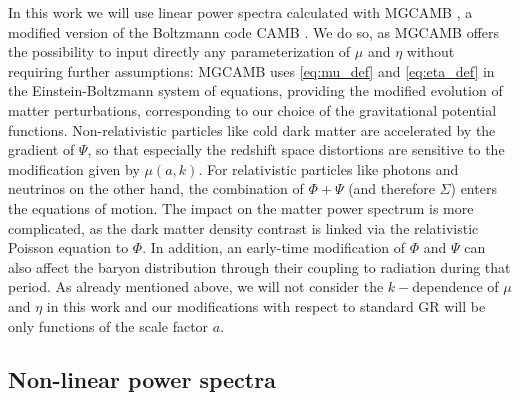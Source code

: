 In this work we will use linear power spectra calculated with MGCAMB
\cite{zhao_searching_2009,hojjati_testing_2011}, a modified version
of the Boltzmann code CAMB \cite{lewis_efficient_2000}. We do so,
as MGCAMB offers the possibility to input directly any parameterization
of $\mu$ and $\eta$ without requiring further assumptions:
MGCAMB uses \cref{eq:mu_def} and \cref{eq:eta_def} in the Einstein-Boltzmann
system of equations, providing the modified evolution of matter perturbations,
corresponding to our choice of the gravitational potential functions.
Non-relativistic particles like cold dark matter are accelerated by the
gradient of $\Psi$, so that especially the redshift space distortions are
sensitive to the modification given by $\mu(a,k)$. For relativistic particles
like photons and neutrinos on the other hand, the combination of $\Phi+\Psi$ (and therefore $\Sigma$)
enters the equations of motion. The impact on the matter power spectrum
is more complicated, as the dark matter density contrast is linked via
the relativistic Poisson equation to $\Phi$. In addition, an early-time
modification of $\Phi$ and $\Psi$ can also affect the baryon distribution through
their coupling to radiation during that period.
As already mentioned above, we will not consider
the $k-$dependence of $\mu$ and $\eta$ in this work and our modifications
with respect to standard GR will be only functions of the scale factor
$a$.


\subsection{Non-linear power spectra \label{sub:MG-nonlinear-spectra}}

\done{}

